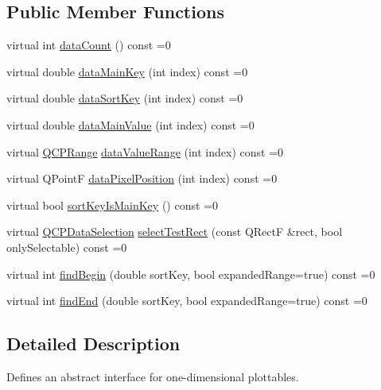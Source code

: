 \subsection*{Public Member Functions}
\begin{DoxyCompactItemize}
\item 
virtual int \hyperlink{class_q_c_p_plottable_interface1_d_a058a22c770ef4d5a0e878a7f02183da9}{data\+Count} () const =0
\item 
virtual double \hyperlink{class_q_c_p_plottable_interface1_d_a2bd60daaac046945fead558cbd83cf73}{data\+Main\+Key} (int index) const =0
\item 
virtual double \hyperlink{class_q_c_p_plottable_interface1_d_afdc92f9f01e7e35f2e96b2ea9dc14ae7}{data\+Sort\+Key} (int index) const =0
\item 
virtual double \hyperlink{class_q_c_p_plottable_interface1_d_af6330919e8023277d08c958a6074fc76}{data\+Main\+Value} (int index) const =0
\item 
virtual \hyperlink{class_q_c_p_range}{Q\+C\+P\+Range} \hyperlink{class_q_c_p_plottable_interface1_d_a9ca7fcf14d885a200879768679b19be9}{data\+Value\+Range} (int index) const =0
\item 
virtual Q\+PointF \hyperlink{class_q_c_p_plottable_interface1_d_a78911838cfbcfd2d8df9ad2fdbfb8e93}{data\+Pixel\+Position} (int index) const =0
\item 
virtual bool \hyperlink{class_q_c_p_plottable_interface1_d_a229e65e7ab968dd6cd0e259fa504b79d}{sort\+Key\+Is\+Main\+Key} () const =0
\item 
virtual \hyperlink{class_q_c_p_data_selection}{Q\+C\+P\+Data\+Selection} \hyperlink{class_q_c_p_plottable_interface1_d_a67093e4ccf490ff5f7750640941ff34c}{select\+Test\+Rect} (const Q\+RectF \&rect, bool only\+Selectable) const =0
\item 
virtual int \hyperlink{class_q_c_p_plottable_interface1_d_a5b95783271306a4de97be54eac1e7d13}{find\+Begin} (double sort\+Key, bool expanded\+Range=true) const =0
\item 
virtual int \hyperlink{class_q_c_p_plottable_interface1_d_a5deced1016bc55a41a2339619045b295}{find\+End} (double sort\+Key, bool expanded\+Range=true) const =0
\end{DoxyCompactItemize}


\subsection{Detailed Description}
Defines an abstract interface for one-\/dimensional plottables. 

